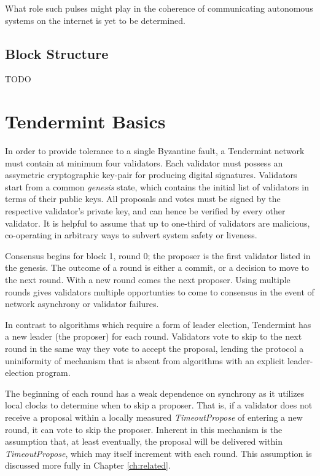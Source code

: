 What role such pulses might play in the coherence of communicating autonomous systems on the internet is yet to be determined.

\subsection{Block Structure}

TODO


\section{Tendermint Basics}

In order to provide tolerance to a single Byzantine fault, a Tendermint network must contain at minimum four validators.
Each validator must possess an assymetric cryptographic key-pair for producing digital signatures.
Validators start from a common \emph{genesis} state, which contains the initial list of validators in terms of their public keys.
All proposals and votes must be signed by the respective validator's private key, and can hence be verified by every other validator.
It is helpful to assume that up to one-third of validators are malicious, co-operating in arbitrary ways to subvert system safety or liveness.

Consensus begins for block 1, round 0; the proposer is the first validator listed in the genesis.
The outcome of a round is either a commit, or a decision to move to the next round.
With a new round comes the next proposer.
Using multiple rounds gives validators multiple opportunties to come to consensus in the event of network asynchrony or validator failures.

In contrast to algorithms which require a form of leader election, Tendermint has a new leader (the proposer) for each round.
Validators vote to skip to the next round in the same way they vote to accept the proposal,
lending the protocol a uniniformity of mechanism that is absent from algorithms with an explicit leader-election program.

The beginning of each round has a weak dependence on synchrony as it utilizes local clocks to determine when to skip a proposer.
That is, if a validator does not receive a proposal within a locally measured \emph{TimeoutPropose} of entering a new round, it can vote to skip the proposer.
Inherent in this mechanism is the assumption that, at least eventually, the proposal will be delivered within \emph{TimeoutPropose}, which may itself increment with each round.
This assumption is discussed more fully in Chapter \ref{ch:related}.


